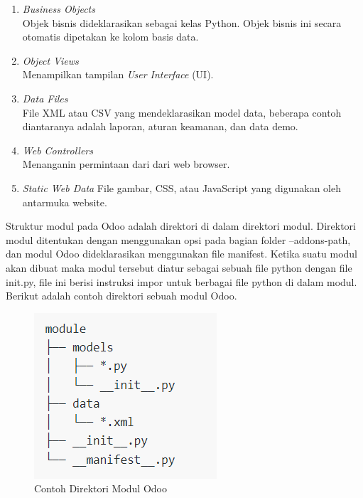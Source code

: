 \begin{enumerate}
	\item \textit{Business Objects} \\
	Objek bisnis dideklarasikan sebagai kelas Python. Objek bisnis ini secara otomatis dipetakan ke kolom basis data.
	\item \textit{Object Views} \\
	Menampilkan tampilan \textit{User Interface} (UI).
	\item \textit{Data Files} \\
	File XML atau CSV yang mendeklarasikan model data, beberapa contoh diantaranya adalah laporan, aturan keamanan, dan data demo.
	\item \textit{Web Controllers} \\
	Menanganin permintaan dari dari web browser.
	\item \textit{Static Web Data}
	File gambar, CSS, atau JavaScript yang digunakan oleh antarmuka website.
\end{enumerate}

Struktur modul pada Odoo adalah direktori di dalam direktori modul. Direktori modul ditentukan dengan menggunakan opsi pada bagian folder --addons-path, dan modul Odoo dideklarasikan menggunakan file manifest. Ketika suatu modul akan dibuat maka modul tersebut diatur sebagai sebuah file python dengan file init.py, file ini berisi instruksi impor untuk berbagai file python di dalam modul. Berikut adalah contoh direktori sebuah modul Odoo.

\begin{figure}[H]
	\centering
	\includegraphics[scale=1]{Gambar/modulOdoo.png}
	\caption{Contoh Direktori Modul Odoo} 
	\label{fig:modulOdoo}
\end{figure}

